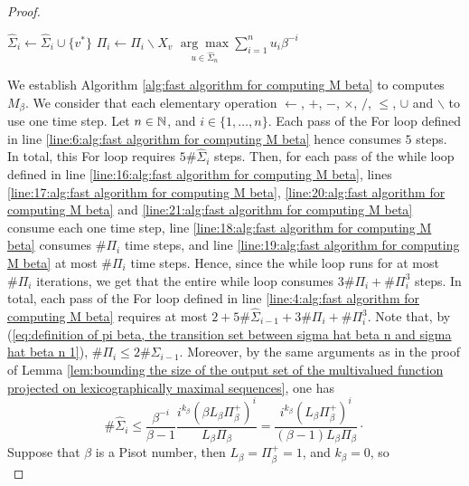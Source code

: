 \begin{proof}
\begin{algorithm}[t]
\begin{algorithmic}[1]
                    \State $\hat \Sigma_i \gets \hat \Sigma_i \cup \{v^\ast\}$ \label{line:20:alg:fast algorithm for computing M beta}
                    \State $\Pi_i \gets \Pi_i \backslash X_v$ \label{line:21:alg:fast algorithm for computing M beta}
                \EndWhile
            \EndFor
            \State \Return $\underset{u \in \hat \Sigma_n}{\arg\max} \sum_{i=1}^n u_i \beta^{-i}$
        \end{algorithmic}
    \end{algorithm}
    We establish Algorithm \ref{alg:fast algorithm for computing M beta} to computes $M_\beta$. We consider that each elementary operation $\gets$, $+$, $-$, $\times$, $/$, $\leq$, $\cup$ and $\backslash$ to use one time step. Let $n \in \mathbb{N}$, and $i \in \{1,\ldots, n \}$. Each pass of the For loop defined in line \ref{line:6:alg:fast algorithm for computing M beta} hence consumes $5$ steps. In total, this For loop requires $5 \# \hat \Sigma_i$ steps. Then, for each pass of the while loop defined in line \ref{line:16:alg:fast algorithm for computing M beta}, lines \ref{line:17:alg:fast algorithm for computing M beta}, \ref{line:20:alg:fast algorithm for computing M beta} and \ref{line:21:alg:fast algorithm for computing M beta} consume each one time step, line \ref{line:18:alg:fast algorithm for computing M beta} consumes $\# \Pi_i$ time steps, and line \ref{line:19:alg:fast algorithm for computing M beta} at most $\# \Pi_i$ time steps. Hence, since the while loop runs for at most $\# \Pi_i$ iterations, we get that the entire while loop consumes $3\#\Pi_i + \#\Pi_i^3$ steps. In total, each pass of the For loop defined in line \ref{line:4:alg:fast algorithm for computing M beta} requires at most $2 + 5 \#\hat \Sigma_{i-1} + 3 \#\Pi_i + \#\Pi_i^3$. Note that, by (\ref{eq:definition of pi beta, the transition set between sigma hat beta n and sigma hat beta n 1}), $\#\Pi_i \leq 2 \# \hat \Sigma_{i-1}$. Moreover, by the same arguments as in the proof of Lemma \ref{lem:bounding the size of the output set of the multivalued function projected on lexicographically maximal sequences}, one has 
    \begin{equation}
        \# \hat \Sigma_{i} \leq \frac{\beta^{-i}}{\beta-1} \frac{i^{k_\beta}(\beta L_\beta \Pi_\beta^+)^i}{L_\beta\Pi_\beta} = \frac{i^{k_\beta}(L_\beta \Pi_\beta^+)^i}{(\beta-1)L_\beta\Pi_\beta}\cdot
    \end{equation}
    Suppose that $\beta$ is a Pisot number, then $L_\beta = \Pi_\beta^+ = 1$, and $k_\beta =0$, so
    \begin{equation}

\end{equation}
\end{proof}
